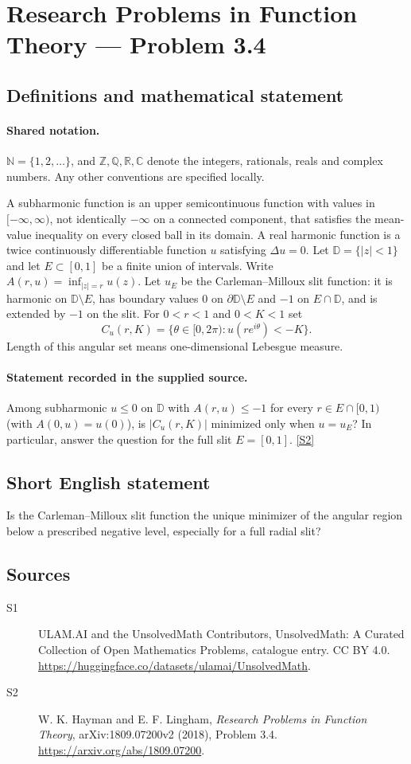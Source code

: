 \documentclass[11pt]{article}
\newcommand{\sref}[2]{\hyperlink{source:#1:#2}{[S#2]}}
\begin{document}
\section{Research Problems in Function Theory — Problem 3.4}\label{statement}

\subsection{Definitions and mathematical statement}

\paragraph{Shared notation.}$\mathbb N=\{1,2,\ldots\}$, and $\mathbb Z,\mathbb Q,\mathbb R,\mathbb C$ denote the integers, rationals, reals and complex numbers. Any other conventions are specified locally.


A subharmonic function is an upper semicontinuous function with values in $[-\infty,\infty)$, not identically $-\infty$ on a connected component, that satisfies the mean-value inequality on every closed ball in its domain. A real harmonic function is a twice continuously differentiable function $u$ satisfying $\Delta u=0$. Let $\mathbb D=\{|z|<1\}$ and let $E\subset[0,1]$ be a finite union of intervals. Write $A(r,u)=\inf_{|z|=r}u(z)$. Let $u_E$ be the Carleman--Milloux slit function: it is harmonic on $\mathbb D\setminus E$, has boundary values $0$ on $\partial\mathbb D\setminus E$ and $-1$ on $E\cap\mathbb D$, and is extended by $-1$ on the slit. For $0<r<1$ and $0<K<1$ set
\[C_u(r,K)=\{\theta\in[0,2\pi):u(re^{i\theta})<-K\}.\]
Length of this angular set means one-dimensional Lebesgue measure.
\paragraph{Statement recorded in the supplied source.}
Among subharmonic $u\leq0$ on $\mathbb D$ with $A(r,u)\leq-1$ for every $r\in E\cap[0,1)$ (with $A(0,u)=u(0)$), is $|C_u(r,K)|$ minimized only when $u=u_E$? In particular, answer the question for the full slit $E=[0,1]$. \sref{statement}{2}
\subsection{Short English statement}
Is the Carleman--Milloux slit function the unique minimizer of the angular region below a prescribed negative level, especially for a full radial slit?
\subsection{Sources}
\begin{description}
\item[\hypertarget{source:statement:1}{S1}] ULAM.AI and the UnsolvedMath Contributors, UnsolvedMath: A Curated Collection of Open Mathematics Problems, catalogue entry. CC BY 4.0. \url{https://huggingface.co/datasets/ulamai/UnsolvedMath}.
\item[\hypertarget{source:statement:2}{S2}] W. K. Hayman and E. F. Lingham, \emph{Research Problems in Function Theory}, arXiv:1809.07200v2 (2018), Problem 3.4. \url{https://arxiv.org/abs/1809.07200}.
\end{description}
\label{end:statement}
\end{document}
